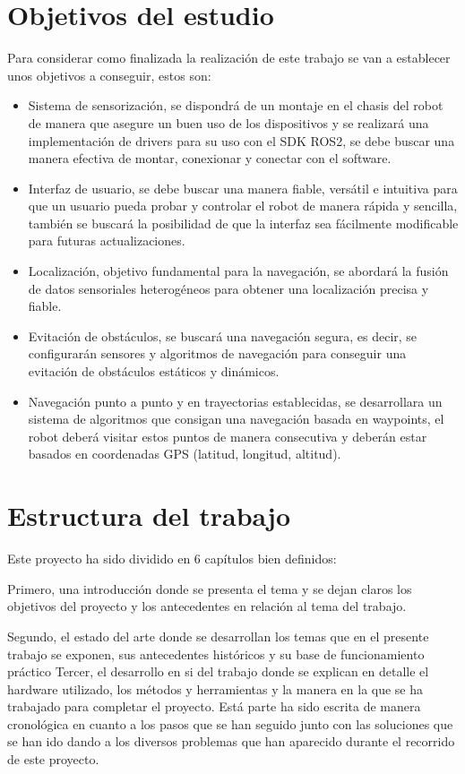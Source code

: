 \newpage

\section{Objetivos del estudio}
Para considerar como finalizada la realización de este trabajo se van a establecer unos objetivos a conseguir, estos son:
\begin{itemize}
  \item Sistema de sensorización, se dispondrá de un montaje en el chasis del robot de manera que asegure un buen uso de los dispositivos y 
se realizará una implementación de drivers para su uso con el SDK ROS2, se debe buscar una manera efectiva de montar, conexionar y conectar 
con el software. 
  \item Interfaz de usuario, se debe buscar una manera fiable, versátil e intuitiva para que un usuario pueda probar y controlar el robot de 
manera rápida y sencilla, también se buscará la posibilidad de que la interfaz sea fácilmente modificable para futuras actualizaciones.
  \item Localización, objetivo fundamental para la navegación, se abordará la fusión de datos sensoriales heterogéneos para obtener una 
localización precisa y fiable.
  \item Evitación de obstáculos, se buscará una navegación segura, es decir, se configurarán sensores y algoritmos de navegación para 
conseguir una evitación de obstáculos estáticos y dinámicos.
  \item Navegación punto a punto y en trayectorias establecidas, se desarrollara un sistema de algoritmos que consigan una navegación 
basada en waypoints, el robot deberá visitar estos puntos de manera consecutiva  y deberán estar basados en coordenadas GPS (latitud, 
longitud, altitud).
\end{itemize}
\newpage

\section{Estructura del trabajo}

Este proyecto ha sido dividido en 6 capítulos bien definidos:

Primero, una introducción donde se presenta el tema y se dejan claros los objetivos del proyecto y los antecedentes en relación al tema del 
trabajo.

Segundo, el estado del arte donde se desarrollan los temas que en el presente trabajo se exponen, sus antecedentes históricos y su base de 
funcionamiento práctico
Tercer, el desarrollo en si del trabajo donde se explican en detalle el hardware utilizado, los métodos y herramientas y la manera en la que 
se ha trabajado para completar el proyecto. Está parte ha sido escrita de manera cronológica en cuanto a los pasos que se han seguido junto 
con las soluciones que se han ido dando a los diversos problemas que han aparecido durante el recorrido de este proyecto.

